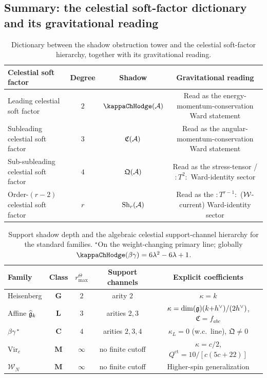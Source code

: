 %
%

\subsection{Summary: the celestial soft-factor dictionary and its gravitational reading}

\begin{table}[h]
\centering
\small
\renewcommand{\arraystretch}{1.25}
\begin{tabular}{lccc}
\toprule
\textbf{Celestial soft factor} &
\textbf{Degree} &
\textbf{Shadow} &
\textbf{Gravitational reading} \\
\midrule
Leading celestial soft factor &
 $2$ & $\kappaChHodge(\cA)$ &
 Read as the energy-momentum-conservation Ward statement \\
Subleading celestial soft factor &
 $3$ & $\mathfrak{C}(\mathcal{A})$ &
 Read as the angular-momentum-conservation Ward statement \\
Sub-subleading celestial soft factor &
 $4$ & $\mathfrak{Q}(\mathcal{A})$ &
 Read as the stress-tensor / $:T^2:$ Ward-identity sector \\
Order-$(r-2)$ celestial soft factor &
 $r$ & $\operatorname{Sh}_r(\mathcal{A})$ &
 Read as the $:T^{r-1}:$ ($\mathcal{W}$-current) Ward-identity sector \\
\bottomrule
\end{tabular}
\caption{Dictionary between the shadow obstruction tower and the
celestial soft-factor hierarchy, together with its gravitational
reading.}
\label{tab:thqg-VI-soft-dictionary}
\end{table}

\begin{table}[h]
\centering
\small
\renewcommand{\arraystretch}{1.25}
\begin{tabular}{lcccc}
\toprule
\textbf{Family} &
\textbf{Class} &
\(r^\Theta_{\max}\) &
\textbf{Support channels} &
\textbf{Explicit coefficients} \\
\midrule
Heisenberg &
 $\mathbf{G}$ & $2$ & arity \(2\) &
 $\kappa = k$ \\
Affine $\widehat{\mathfrak{g}}_k$ &
 $\mathbf{L}$ & $3$ & arities \(2,3\) &
 $\kappa = \dim(\mathfrak{g})(k{+}h^\vee)/(2h^\vee)$, $\mathfrak{C} = f_{abc}$ \\
$\beta\gamma$\,$^\star$ &
 $\mathbf{C}$ & $4$ & arities \(2,3,4\) &
 $\kappa_L = 0$ (w.c.\ line), $\mathfrak{Q} \neq 0$ \\
$\mathrm{Vir}_c$ &
 $\mathbf{M}$ & $\infty$ & no finite cutoff &
 $\kappa = c/2$, $Q^{\mathrm{ct}} = 10/[c(5c+22)]$ \\
$\mathcal{W}_N$ &
 $\mathbf{M}$ & $\infty$ & no finite cutoff &
 Higher-spin generalization \\
\bottomrule
\end{tabular}
\caption{Support shadow depth and the algebraic celestial support-channel
hierarchy for the standard families. ${}^\star$On the weight-changing primary line;
globally $\kappaChHodge(\beta\gamma) = 6\lambda^2 - 6\lambda + 1$.}
\end{table}

